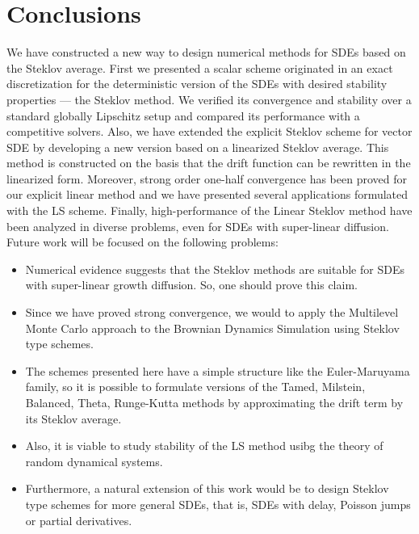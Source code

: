 \section{Conclusions}
	We have constructed a new way  to design numerical methods for SDEs based on the Steklov average.
First we presented a scalar scheme  originated in an exact discretization for the deterministic version of the SDEs 
with desired stability properties --- the Steklov method.
We verified its convergence and stability over a standard globally Lipschitz setup and compared its performance with a 
competitive solvers.
%
Also, we have extended the explicit Steklov scheme for vector SDE by developing a new version based on a linearized 
Steklov average. This method is constructed on the basis that the drift function can be rewritten in the linearized 
form. Moreover, strong order one-half convergence has been proved for our explicit linear method and we have presented 
several applications formulated with the LS scheme. Finally, high-performance of the Linear Steklov method have been 
analyzed in diverse problems, even for SDEs with super-linear diffusion.
Future work will be focused on the following problems:

\begin{itemize}
	\item
		Numerical evidence suggests that the Steklov methods are suitable for SDEs with super-linear growth diffusion. 
		So, one should prove this claim.
	\item
		Since we have proved strong convergence, we would to apply the Multilevel Monte Carlo approach to
		the Brownian Dynamics Simulation using Steklov type schemes.		

	\item
		The schemes presented here have a simple structure like the	Euler-Maruyama family, so it is possible 
		to formulate versions of the Tamed, Milstein, Balanced, Theta, 
		Runge-Kutta methods by approximating the drift term by its Steklov average.  
	\item	
		Also, it is viable to study stability of the LS method usibg the theory of random dynamical systems.
	\item
		Furthermore, a natural extension of this work would be to design Steklov type schemes for more general SDEs, 
		that is, SDEs with delay, Poisson jumps or partial derivatives. 	
\end{itemize}

%

 
 
